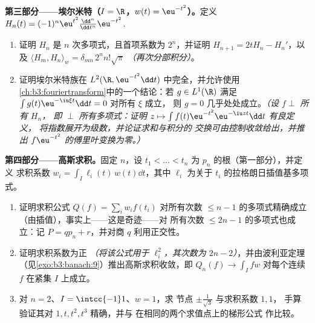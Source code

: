 \begin{problem}
\medskip
\noindent\textbf{第三部分——埃尔米特（$I = \R$，$w(t) =
\eu^{-t^2}$）。}定义 $H_n(t) =
(-1)^n\eu^{t^2}\frac{\dd^n}{\dd t^n}\eu^{-t^2}$.
\begin{enumerate}[resume]
  \item 证明 $H_n$ 是 $n$ 次多项式，且首项系数为
        $2^n$，并证明 $H_{n+1} = 2tH_n -
        H_n'$，以及 $\langle H_m, H_n\rangle_w =
        \delta_{mn}\,2^nn!\sqrt\pi$ \emph{（再次分部积分）}。
  \item 证明埃尔米特族在 $L^2(\R,
        \eu^{-t^2}\dd t)$ 中完全，并允许使用
        \cref{ch:b3:fouriertransform}中的一个结论：若 $g \in L^1(\R)$ 满足
        $\int g(t)\eu^{-\iu\xi t}\dd t = 0$ 对所有 $\xi$ 成立，
        则 $g = 0$ 几乎处处成立。\emph{（设 $f \perp$ 所有 $H_n$，
        即 $\perp$ 所有多项式：证明 $z \mapsto \int
        f(t)\eu^{-t^2}\eu^{-\iu zt}\dd t$ 有良定义，
        将指数展开为级数，并论证求和与积分的
        交换可由控制收敛给出，并推出
        $f\eu^{-t^2}$ 的傅里叶变换为零。）}
\end{enumerate}

\medskip
\noindent\textbf{第四部分——高斯求积。}固定 $n$，设
$t_1 < \dots < t_n$ 为 $p_n$ 的根（第一部分），并定义
求积系数 $w_i = \int_I \ell_i(t)\,w(t)\dd t$，其中
$\ell_i$ 为关于
$t_i$ 的拉格朗日插值基多项式。
\begin{enumerate}[resume]
  \item 证明求积公式 $Q(f) = \sum_iw_if(t_i)$
        对所有次数 $\leq n - 1$ 的多项式精确成立
        （由插值），事实上——这是奇迹——对
        所有次数 $\leq 2n - 1$ 的多项式也成立：记 $P =
        qp_n + r$，并对商 $q$ 利用正交性。
  \item 证明求积系数为正
        \emph{（将该公式用于 $\ell_i^2$，其次数为 $2n -
        2$）}，并由波利亚定理
        （见\cref{exo:b3:banach:9}）推出高斯求积收敛，即
        $Q_n(f) \to \int_I fw$ 对每个连续
        $f$ 在紧集 $I$ 上成立。
  \item 对 $n = 2$、$I = \intcc{-1}1$、$w = 1$，求
        节点 $\pm\frac1{\sqrt3}$ 与求积系数 $1, 1$，
        手算验证其对 $1, t, t^2, t^3$ 精确，并与
        在相同的两个求值点上的梯形公式
        作比较。
\end{enumerate}


\end{problem}
